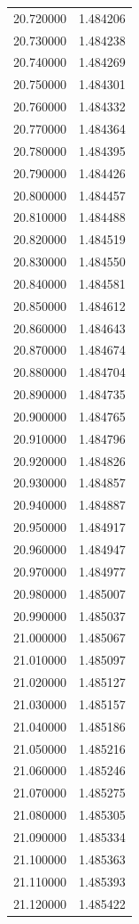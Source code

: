 \begin{tabular}{rr}
20.720000 & 1.484206 \\
20.730000 & 1.484238 \\
20.740000 & 1.484269 \\
20.750000 & 1.484301 \\
20.760000 & 1.484332 \\
20.770000 & 1.484364 \\
20.780000 & 1.484395 \\
20.790000 & 1.484426 \\
20.800000 & 1.484457 \\
20.810000 & 1.484488 \\
20.820000 & 1.484519 \\
20.830000 & 1.484550 \\
20.840000 & 1.484581 \\
20.850000 & 1.484612 \\
20.860000 & 1.484643 \\
20.870000 & 1.484674 \\
20.880000 & 1.484704 \\
20.890000 & 1.484735 \\
20.900000 & 1.484765 \\
20.910000 & 1.484796 \\
20.920000 & 1.484826 \\
20.930000 & 1.484857 \\
20.940000 & 1.484887 \\
20.950000 & 1.484917 \\
20.960000 & 1.484947 \\
20.970000 & 1.484977 \\
20.980000 & 1.485007 \\
20.990000 & 1.485037 \\
21.000000 & 1.485067 \\
21.010000 & 1.485097 \\
21.020000 & 1.485127 \\
21.030000 & 1.485157 \\
21.040000 & 1.485186 \\
21.050000 & 1.485216 \\
21.060000 & 1.485246 \\
21.070000 & 1.485275 \\
21.080000 & 1.485305 \\
21.090000 & 1.485334 \\
21.100000 & 1.485363 \\
21.110000 & 1.485393 \\
21.120000 & 1.485422 \\

\end{tabular}
